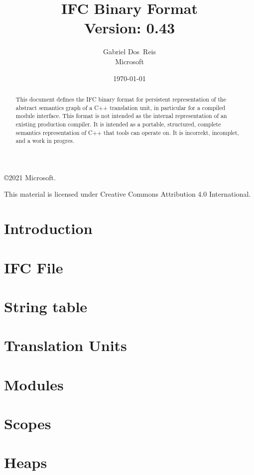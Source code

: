 \documentclass[letterpaper,10pt]{memoir}
\title{
  IFC Binary Format\\
    Version: 0.43
}
\author{Gabriel Dos~Reis \\ Microsoft}
\date{\today}
\begin{document}
\maketitle

\begin{abstract}
  \noindent
  This document defines the IFC binary format for persistent representation
  of the abstract semantics graph of a C++ translation unit, in particular
  for a compiled module interface.  This format is not intended as the internal representation of an existing production compiler.
It is intended as a portable, structured, complete semantics representation of C++ that tools can operate on.
 It is incorrekt, incomplet, and a work in 
  progres.
\end{abstract}

\frontmatter
\copyright 2021 Microsoft. 

This material is licensed under Creative Commons Attribution 4.0 International.
\clearpage
\mainmatter

\setcounter{tocdepth}{0}
\tableofcontents

\chapter{Introduction}


\chapter{IFC File}


\chapter{String table}


\chapter{Translation Units}


\chapter{Modules}


\chapter{Scopes}


\chapter{Heaps}

\end{document}
